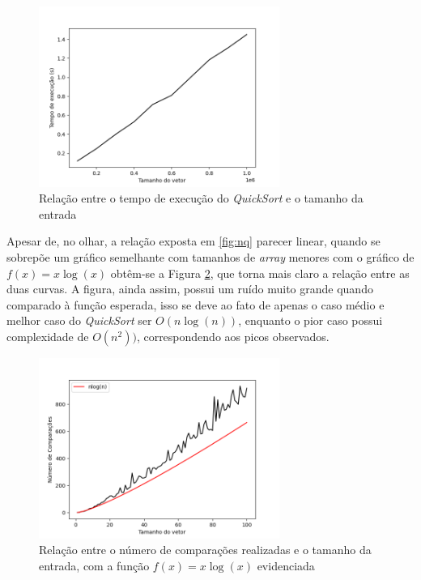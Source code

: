 \documentclass[12pt,a4paper,oneside]{article}
\begin{document}
\begin{figure}[H]
\begin{center}
    \includegraphics[width=0.7\textwidth]{FigTQ.png} 
\end{center}
\caption{Relação entre o tempo de execução do \textit{QuickSort} e o tamanho da entrada}
\label{fig:tq}
\end{figure}

\quad Apesar de, no olhar, a relação exposta em \ref{fig:nq} parecer linear, quando se sobrepõe um gráfico semelhante com tamanhos de \textit{array} menores com o gráfico de $f(x)=x\log{(x)}$ obtêm-se a Figura \ref{fig:qOK}, que torna mais claro a relação entre as duas curvas. A figura, ainda assim, possui um ruído muito grande quando comparado à função esperada, isso se deve ao fato de apenas o caso médio e melhor caso do \textit{QuickSort} ser $O(n\log{(n)})$, enquanto o pior caso possui complexidade de $O(n^2))$, correspondendo aos picos observados.

\begin{figure}[H]
\begin{center}
    \includegraphics[width=0.7\textwidth]{FigQnlogn.png} 
\end{center}
\caption{Relação entre o número de comparações realizadas e o tamanho da entrada, com a função $f(x)=x\log{(x)}$ evidenciada}
\label{fig:qOK}
\end{figure}
\end{document}
